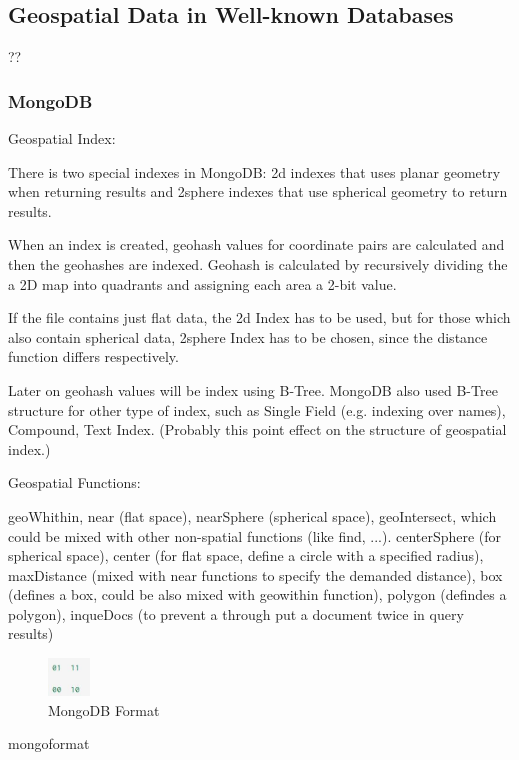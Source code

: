 \documentclass[a4paper,12pt]{article}
\begin{document}
\subsection{Geospatial Data in Well-known Databases} ??
\label{s.dbs}
\subsubsection{MongoDB}
\cite{mongogeneral2010}
\cite{mongoinaction2011}

Geospatial Index:

There is two special indexes in MongoDB: 2d indexes that uses planar geometry when returning results and 2sphere indexes that use spherical geometry to return results.

When an index is created, geohash values for coordinate pairs are calculated and then the geohashes are indexed.
Geohash is calculated by recursively dividing the a 2D map into quadrants and assigning each area a 2-bit value.


If the file contains just flat data, the 2d Index has to be used, but for those which also contain spherical data, 2sphere Index has to be chosen, since the distance function differs respectively.

Later on geohash values will be index using B-Tree. 
MongoDB also used B-Tree structure for other type of index, such as Single Field (e.g. indexing over names), Compound, Text Index. (Probably this point effect on the structure of geospatial index.)

Geospatial Functions:

geoWhithin, near (flat space), nearSphere (spherical space), geoIntersect, which could be mixed with other non-spatial functions (like find, ...). 
centerSphere (for spherical space), center (for flat space, define a circle with a specified radius), maxDistance (mixed with near functions to specify the demanded distance), box (defines a box, could be also mixed with geowithin function), polygon (defindes a polygon), inqueDocs (to prevent a through put a document twice in query results)

\begin{figure}
\centering
\includegraphics[width=0.1\textwidth]{mongoformat}
\caption{MongoDB Format}
\label{fig}
\end{figure}

mongoformat
\end{document}
